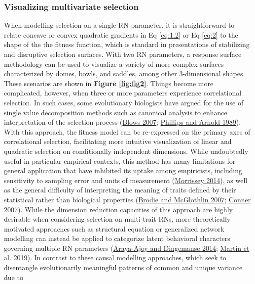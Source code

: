 \documentclass{article}
\begin{document}
\hypertarget{visualizing-multivariate-selection}{%
\subsubsection{Visualizing multivariate
selection}\label{visualizing-multivariate-selection}}

When modelling selection on a single RN parameter, it is straightforward
to relate concave or convex quadratic gradients in Eq \ref{eq:1.2} or Eq
\ref{eq:2} to the shape of the the fitness function, which is standard
in presentations of stabilizing and disruptive selection surfaces. With
two RN parameters, a response surface methodology can be used to
visualize a variety of more complex surfaces characterized by domes,
bowls, and saddles, among other 3-dimensional shapes. These scenarios
are shown in \textbf{Figure \ref{fig:fig2}}. Things become more
complicated, however, when three or more parameters experience
correlational selection. In such cases, some evolutionary biologists
have argued for the use of single value decomposition methods such as
canonical analysis to enhance interpretation of the selection process
(\protect\hyperlink{ref-Blows2007}{Blows 2007};
\protect\hyperlink{ref-Phillips1989}{Phillips and Arnold 1989}). With
this approach, the fitness model can be re-expressed on the primary axes
of correlational selection, facilitating more intuitive visualization of
linear and quadratic selection on conditionally independent dimensions.
While undoubtedly useful in particular empirical contexts, this method
has many limitations for general application that have inhibited its
uptake among empiricists, including sensitivity to sampling error and
units of measurement (\protect\hyperlink{ref-Morrissey2014}{Morrissey
2014}), as well as the general difficulty of interpreting the meaning of
traits defined by their statistical rather than biological properties
(\protect\hyperlink{ref-Brodie2007}{Brodie and McGlothlin 2007};
\protect\hyperlink{ref-Conner2007}{Conner 2007}). While the dimension
reduction capacities of this approach are highly desirable when
considering selection on multi-trait RNs, more theoretically motivated
approaches such as structural equation or generalized network modelling
can instead be applied to categorize latent behavioral characters
governing multiple RN parameters
(\protect\hyperlink{ref-Araya2014}{Araya-Ajoy and Dingemanse 2014};
\protect\hyperlink{ref-Martin2019}{Martin et al. 2019}). In contrast to
these causal modelling approaches, which seek to disentangle
evolutionarily meaningful patterns of common and unique variance due to
\end{document}
